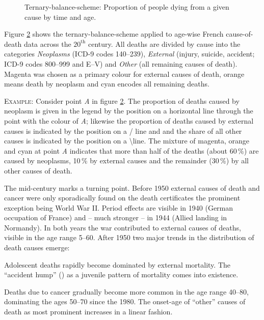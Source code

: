 \documentclass[a4paper]{scrartcl}
\begin{document}
\begin{figure}[htb!]
\begin{subfigure}[t]{0.35\textwidth}
  \label{fig:tbslegend}
  \end{subfigure}%
  \caption{Ternary-balance-scheme: Proportion of people dying from a given cause by time and age.}
  \label{fig:tbs}
\end{figure}

Figure \ref{fig:tbs} shows the ternary-balance-scheme applied to age-wise French cause-of-death data across the $20^\text{th}$ century. All deaths are divided by cause into the categories \emph{Neoplasms} (ICD-9 codes 140--239), \emph{External} (injury, suicide, accident; ICD-9 codes 800--999 and E--V) and \emph{Other} (all remaining causes of death). Magenta was chosen as a primary colour for external causes of death, orange means death by neoplasm and cyan encodes all remaining deaths.

\textsc{Example:} Consider point \emph{A} in figure \ref{fig:tbs}. The proportion of deaths caused by neoplasm is given in the legend by the position on a horizontal line through the point with the colour of \emph{A}; likewise the proportion of deaths caused by external causes is indicated by the position on a / line and and the share of all other causes is indicated by the position on a \textbackslash line. The mixture of magenta, orange and cyan at point \emph{A} indicates that more than half of the deaths (about 60\,\%) are caused by neoplasms, 10\,\% by external causes and the remainder (30\,\%) by all other causes of death.

The mid-century marks a turning point. Before 1950 external causes of death and cancer were only sporadically found on the death certificates the prominent exception being World War II. Period effects are visible in 1940 (German occupation of France) and -- much stronger -- in 1944 (Allied landing in Normandy). In both years the war contributed to external causes of deaths, visible in the age range 5--60. After 1950 two major trends in the distribution of death causes emerge:
\begin{inparaenum}
\item Adolescent deaths rapidly become dominated by external mortality. The \enquote{accident hump} (\cite{Heligman1980}) as a juvenile pattern of mortality comes into existence.
\item Deaths due to cancer gradually become more common in the age range 40--80, dominating the ages 50--70 since the 1980. The onset-age of \enquote{other} causes of death as most prominent increases in a linear fashion.
\end{inparaenum}
\end{document}
